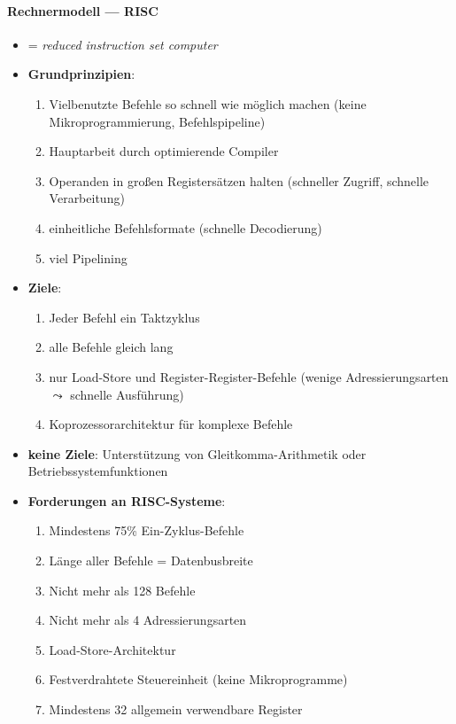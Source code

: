 \paragraph{Rechnermodell --- RISC}
\begin{itemize}
	\item = \emph{reduced instruction set computer}
	\item \textbf{Grundprinzipien}:
	\begin{enumerate}
	 	\item Vielbenutzte Befehle so schnell wie möglich machen (keine Mikroprogrammierung, Befehlspipeline)
	 	\item Hauptarbeit durch optimierende Compiler
	 	\item Operanden in großen Registersätzen halten (schneller Zugriff, schnelle Verarbeitung)
	 	\item einheitliche Befehlsformate (schnelle Decodierung)
	 	\item viel Pipelining
	 \end{enumerate}
	\item \textbf{Ziele}:
	\begin{enumerate}
		\item Jeder Befehl ein Taktzyklus
		\item alle Befehle gleich lang
		\item nur Load-Store und Register-Register-Befehle (wenige Adressierungsarten $\leadsto$ schnelle Ausführung)
		\item Koprozessorarchitektur für komplexe Befehle
	\end{enumerate}
	\item \textbf{keine Ziele}: Unterstützung von Gleitkomma-Arithmetik oder Betriebssystemfunktionen
	\item \textbf{Forderungen an RISC-Systeme}: 
	\begin{enumerate}
		\item Mindestens 75\% Ein-Zyklus-Befehle
		\item Länge aller Befehle = Datenbusbreite
		\item Nicht mehr als 128 Befehle
		\item Nicht mehr als 4 Adressierungsarten
		\item Load-Store-Architektur
		\item Festverdrahtete Steuereinheit (keine Mikroprogramme)
		\item Mindestens 32 allgemein verwendbare Register
	\end{enumerate}
\end{itemize}

